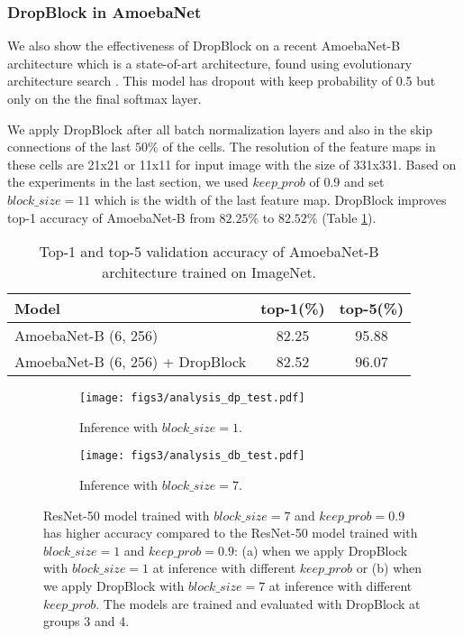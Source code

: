 \documentclass{article}
\begin{document}
\subsubsection{DropBlock in AmoebaNet}
We also show the effectiveness of DropBlock on a recent AmoebaNet-B
architecture which is a state-of-art architecture, found using evolutionary architecture search \cite{real2018regularized}.
This model has dropout with keep probability of 0.5 but only on the the final softmax layer.

We apply DropBlock after all batch normalization layers and also in the skip connections
of the last $50\%$ of the cells. The resolution of the feature maps in these cells are 21x21 or 11x11 for input image with the size of 331x331. Based on the experiments in the last section, we used $keep\_prob$ of 0.9 and set $block\_size=11$ which is the width of the last feature map.
DropBlock improves top-1 accuracy of AmoebaNet-B from $82.25\%$ to $82.52\%$ (Table \ref{fig:AmoebaNet}).

\begin{table}[h!]
  \centering
        \begin{tabular}{l|cc}
            \hline
              \footnotesize Model  & \footnotesize top-1(\%) & \footnotesize top-5(\%)\\
            \hline \hline
            \footnotesize AmoebaNet-B (6, 256)                      & \footnotesize 82.25  &  95.88 \\
            \footnotesize AmoebaNet-B (6, 256) + DropBlock & \footnotesize 82.52  &  96.07 \\
        \hline
        \end{tabular}
  \caption{Top-1 and top-5 validation accuracy of AmoebaNet-B architecture trained on ImageNet.}
  \label{fig:AmoebaNet}
\end{table}

\begin{figure}[h!]
  \centering
  \begin{subfigure}[b]{0.48\textwidth}
      \texttt{[image: figs3/analysis\_dp\_test.pdf]}
      \caption{Inference with $block\_size = 1$.}
  \end{subfigure}
  \begin{subfigure}[b]{0.48\textwidth}
      \texttt{[image: figs3/analysis\_db\_test.pdf]}
      \caption{Inference with $block\_size = 7$.}
  \end{subfigure}
\caption{ResNet-50 model trained with $block\_size=7$ and $keep\_prob=0.9$ has higher accuracy compared to the ResNet-50 model trained with $block\_size=1$ and $keep\_prob=0.9$:
    (a) when we apply DropBlock with $block\_size=1$ at inference with different $keep\_prob$ or 
    (b) when we apply DropBlock with $block\_size=7$ at inference with different $keep\_prob$.
    The models are trained and evaluated with DropBlock at groups 3 and 4.  
    }
  \label{fig:analysis}
\end{figure}
\end{document}
